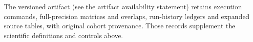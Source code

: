 The versioned artifact (see the \hyperref[sec:artifact-availability]{artifact availability statement}) retains execution commands, full-precision matrices and overlaps, run-history ledgers and expanded source tables, with original cohort provenance. Those records supplement the scientific definitions and controls above.
\FloatBarrier
